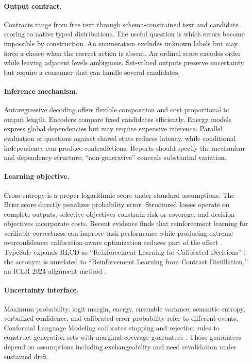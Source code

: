 \documentclass[11pt]{article}
\begin{document}
\paragraph{Output contract.} Contracts range from free text through schema-constrained text and candidate scoring to native typed distributions. The useful question is which errors become impossible by construction. An enumeration excludes unknown labels but may force a choice when the correct action is absent. An ordinal score encodes order while leaving adjacent levels ambiguous. Set-valued outputs preserve uncertainty but require a consumer that can handle several candidates.

\paragraph{Inference mechanism.} Autoregressive decoding offers flexible composition and cost proportional to output length. Encoders compare fixed candidates efficiently. Energy models express global dependencies but may require expensive inference. Parallel evaluation of questions against shared state reduces latency, while conditional independence can produce contradictions. Reports should specify the mechanism and dependency structure; ``non-generative'' conceals substantial variation.

\paragraph{Learning objective.} Cross-entropy is a proper logarithmic score under standard assumptions. The Brier score directly penalizes probability error. Structured losses operate on complete outputs, selective objectives constrain risk or coverage, and decision objectives incorporate costs. Recent evidence finds that reinforcement learning for verifiable correctness can improve task performance while producing extreme overconfidence; calibration-aware optimization reduces part of the effect \cite{yaldiz2026calibrationrl}. TypeSafe expands RLCD as ``Reinforcement Learning for Calibrated Decisions'' \cite{almeida2026jev}; the acronym is unrelated to ``Reinforcement Learning from Contrast Distillation,'' an ICLR 2024 alignment method \cite{yang2024rlcd}.

\paragraph{Uncertainty interface.} Maximum probability, logit margin, energy, ensemble variance, semantic entropy, verbalized confidence, and calibrated error probability refer to different events. Conformal Language Modeling calibrates stopping and rejection rules to construct generation sets with marginal coverage guarantees \cite{quach2024conformal}. Those guarantees depend on assumptions including exchangeability and need revalidation under sustained drift.
\end{document}
